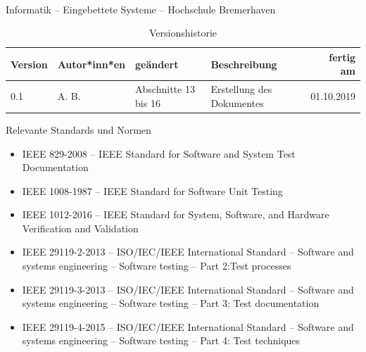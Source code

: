 \begin{center}
  \makeatletter
  \textbf{
    \@title
  }
  \makeatother
  \\[1em]
  Informatik -- Eingebettete Systeme -- Hochschule Bremerhaven
\end{center}

\begin{table}[ht]
  \centering
  \begin{tabular}[t]{|p{15mm}|p{30mm}|p{30mm}|p{50mm}|r|}
    \hline
    \textbf{Version} & \textbf{Autor*inn*en} & \textbf{geändert} & \textbf{Beschreibung} & \textbf{fertig am}\\
    \hline
    0.1              & A. B.            &  Abschnitte 13 bis 16  & Erstellung des Dokumentes & 01.10.2019\\
    \hline
  \end{tabular}
  \caption{Versionshistorie}
\end{table}

\vspace*{4em}

Relevante Standards und Normen
\begin{itemize}
\item IEEE 829-2008 -- IEEE Standard for Software and System Test
  Documentation

  \cite{ieee-829-2008-system-test-documentation}
\item IEEE 1008-1987 -- IEEE Standard for Software Unit Testing

  \cite{ieee-1008-1987-unit-testing}
\item IEEE 1012-2016 -- IEEE Standard for System, Software, and
  Hardware Verification and Validation

  \cite{ieee-1012-2016-hardware-verification-validation}
\item IEEE 29119-2-2013 -- ISO/IEC/IEEE International Standard --
  Software and systems engineering -- Software testing -- Part 2:Test
  processes

  \cite{ieee-29119-2-2013-test-processes}
\item IEEE 29119-3-2013 -- ISO/IEC/IEEE International Standard --
  Software and systems engineering -- Software testing -- Part 3: Test
  documentation

  \cite{ieee-29119-3-2013-test-documentation}
\item IEEE 29119-4-2015 -- ISO/IEC/IEEE International Standard --
  Software and systems engineering -- Software testing -- Part 4: Test
  techniques

  \cite{ieee-29119-4-2013-test-techniques}
\end{itemize}
\clearpage

